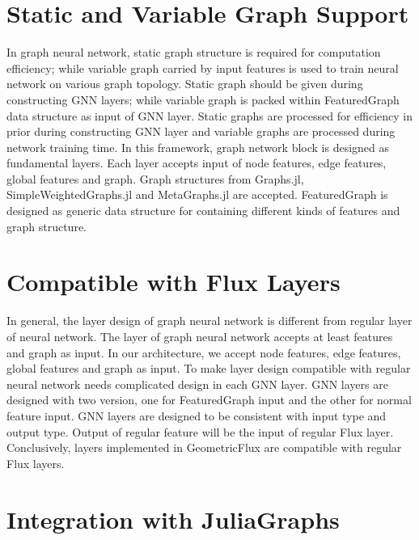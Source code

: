 \documentclass{juliacon}
\begin{document}
\section{Static and Variable Graph Support}

In graph neural network, static graph structure is required for computation efficiency;
while variable graph carried by input features is used to train neural network on various
graph topology. Static graph should be given during constructing GNN layers; while variable
graph is packed within FeaturedGraph data structure as input of GNN layer. Static graphs are
processed for efficiency in prior during constructing GNN layer and variable graphs are
processed during network training time. In this framework, graph network block is designed as
fundamental layers. Each layer accepts input of node features, edge features, global features
and graph. Graph structures from Graphs.jl, SimpleWeightedGraphs.jl and MetaGraphs.jl
are accepted. FeaturedGraph is designed as generic data structure for containing different
kinds of features and graph structure.

\section{Compatible with Flux Layers}

In general, the layer design of graph neural network is different from regular layer of
neural network. The layer of graph neural network accepts at least features and graph as input.
In our architecture, we accept node features, edge features, global features and graph as input.
To make layer design compatible with regular neural network needs complicated design in
each GNN layer. GNN layers are designed with two version, one for FeaturedGraph input and
the other for normal feature input. GNN layers are designed to be consistent with input type
and output type. Output of regular feature will be the input of regular Flux layer.
Conclusively, layers implemented in GeometricFlux are compatible with regular Flux layers.

\section{Integration with JuliaGraphs}
\end{document}

